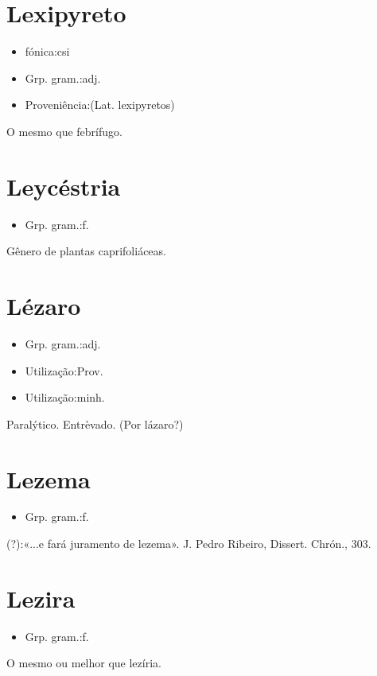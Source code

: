 \section{Lexipyreto}
\begin{itemize}
\item {fónica:csi}
\end{itemize}
\begin{itemize}
\item {Grp. gram.:adj.}
\end{itemize}
\begin{itemize}
\item {Proveniência:(Lat. \textunderscore lexipyretos\textunderscore )}
\end{itemize}
O mesmo que \textunderscore febrífugo\textunderscore .
\section{Leycéstria}
\begin{itemize}
\item {Grp. gram.:f.}
\end{itemize}
Gênero de plantas caprifoliáceas.
\section{Lézaro}
\begin{itemize}
\item {Grp. gram.:adj.}
\end{itemize}
\begin{itemize}
\item {Utilização:Prov.}
\end{itemize}
\begin{itemize}
\item {Utilização:minh.}
\end{itemize}
Paralýtico.
Entrèvado.
(Por \textunderscore lázaro\textunderscore ?)
\section{Lezema}
\begin{itemize}
\item {Grp. gram.:f.}
\end{itemize}
(?):«\textunderscore ...e fará juramento de lezema\textunderscore ». J. Pedro Ribeiro, \textunderscore Dissert. Chrón.\textunderscore , 303.
\section{Lezira}
\begin{itemize}
\item {Grp. gram.:f.}
\end{itemize}
O mesmo ou melhor que \textunderscore lezíria\textunderscore .
